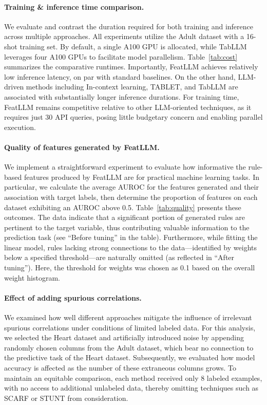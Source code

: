 \vspace*{-0.12in}
\paragraph{Training \& inference time comparison.} We evaluate and contrast the duration required for both training and inference across multiple approaches. All experiments utilize the Adult dataset with a 16-shot training set. By default, a single A100 GPU is allocated, while TabLLM leverages four A100 GPUs to facilitate model parallelism. Table~\ref{tab:cost} summarizes the comparative runtimes. Importantly, \textsf{FeatLLM} achieves relatively low inference latency, on par with standard baselines. On the other hand, LLM-driven methods including In-context learning, TABLET, and TabLLM are associated with substantially longer inference durations. For training time, \textsf{FeatLLM} remains competitive relative to other LLM-oriented techniques, as it requires just 30 API queries, posing little budgetary concern and enabling parallel execution.

\vspace*{-0.12in}
\paragraph{Quality of features generated by \textsf{FeatLLM}.} 
We implement a straightforward experiment to evaluate how informative the rule-based features produced by \textsf{FeatLLM} are for practical machine learning tasks. In particular, we calculate the average AUROC for the features generated and their association with target labels, then determine the proportion of features on each dataset exhibiting an AUROC above 0.5. Table~\ref{tab:quality} presents these outcomes. The data indicate that a significant portion of generated rules are pertinent to the target variable, thus contributing valuable information to the prediction task (see “Before tuning” in the table). Furthermore, while fitting the linear model, rules lacking strong connections to the data—identified by weights below a specified threshold—are naturally omitted (as reflected in “After tuning”). Here, the threshold for weights was chosen as 0.1 based on the overall weight histogram.

\vspace*{-0.12in}
\paragraph{Effect of adding spurious correlations.} We examined how well different approaches mitigate the influence of irrelevant spurious correlations under conditions of limited labeled data. For this analysis, we selected the Heart dataset and artificially introduced noise by appending randomly chosen columns from the Adult dataset, which bear no connection to the predictive task of the Heart dataset. Subsequently, we evaluated how model accuracy is affected as the number of these extraneous columns grows. To maintain an equitable comparison, each method received only 8 labeled examples, with no access to additional unlabeled data, thereby omitting techniques such as SCARF or STUNT from consideration.

